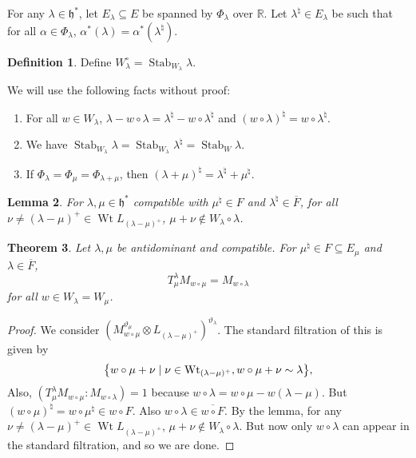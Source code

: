 \documentclass[leqno, openany]{memoir}
\newtheorem{thm}{Theorem}[section]
\newtheorem{lem}[thm]{Lemma}
\theoremstyle{definition}
\newtheorem{defn}[thm]{Definition}
\theoremstyle{remark}
\theoremstyle{plain}
\theoremstyle{definition}
\theoremstyle{remark}
\newcommand{\R}{\mathbb{R}}
\newcommand{\h}{\mathfrak{h}}
\newcommand{\on}[1]{\operatorname{#1}}
\newcommand{\ol}[1]{\overline{#1}}
\begin{document}
For any $\lambda \in \h^*$, let $E_{\lambda} \subseteq E$ be spanned by $\Phi_{\lambda}$ over $\R$. Let $\lambda^{\natural} \in E_{\lambda}$ be such that for all $\alpha \in \Phi_{\lambda}$, $\alpha^*(\lambda) = \alpha^*(\lambda^{\natural})$.

\begin{defn}
    Define $W_{\lambda}^{\circ} = \operatorname{Stab}_{W_{\lambda}} \lambda$.
\end{defn}

We will use the following facts without proof:
\begin{enumerate}
    \item For all $w \in W_{\lambda}$, $\lambda - w \circ \lambda = \lambda^{\natural} - w \circ \lambda^{\natural}$ and $(w \circ \lambda)^{\natural} = w \circ \lambda^{\natural}$.
    \item We have $\on{Stab}_{W_{\lambda}} \lambda = \on{Stab}_{W_{\lambda}} \lambda^{\natural} = \on{Stab}_W \lambda$.
    \item If $\Phi_{\lambda} = \Phi_{\mu} = \Phi_{\lambda + \mu}$, then $(\lambda + \mu)^{\natural} = \lambda^{\natural} + \mu^{\natural}$.
\end{enumerate}

\begin{lem}
    For $\lambda, \mu \in \h^*$ compatible with $\mu^{\natural} \in F$ and $\lambda^{\natural} \in \ol{F}$, for all $\nu \neq (\lambda - \mu)^+ \in \on{Wt} L_{(\lambda - \mu)^+}$, $\mu + \nu \notin W_{\lambda} \circ \lambda$.
\end{lem}

\begin{thm}
    Let $\lambda, \mu$ be antidominant and compatible. For $\mu^{\natural} \in F \subseteq E_{\mu}$ and $\lambda \in \ol{F}$, 
    \[ T_{\mu}^{\lambda} M_{w \circ \mu} = M_{w \circ \lambda} \]
    for all $w \in W_{\lambda} = W_{\mu}$.
\end{thm}

\begin{proof}
    We consider $(M_{w \circ \mu}^{\vartheta_{\mu}} \otimes L_{(\lambda - \mu)^+})^{\vartheta_{\lambda}}$. The standard filtration of this is given by
    \[ \qty{w \circ \mu + \nu \mid \nu \in \on{Wt}_{(\lambda - \mu)^+}, w \circ \mu + \nu \sim \lambda}, \]
    Also, $(T_{\mu}^{\lambda} M_{w \circ \mu} : M_{w \circ \lambda}) = 1$ because $w \circ \lambda = w \circ \mu - w(\lambda - \mu)$. But $(w \circ \mu)^{\natural} = w \circ \mu^{\natural} \in w \circ F$. Also $w \circ \lambda \in \ol{w \circ F}$. By the lemma, for any $\nu \neq (\lambda - \mu)^+ \in \on{Wt} L_{(\lambda - \mu)^+}$, $\mu + \nu \notin W_{\lambda} \circ \lambda$. But now only $w \circ \lambda$ can appear in the standard filtration, and so we are done.
\end{proof}
\end{document}
